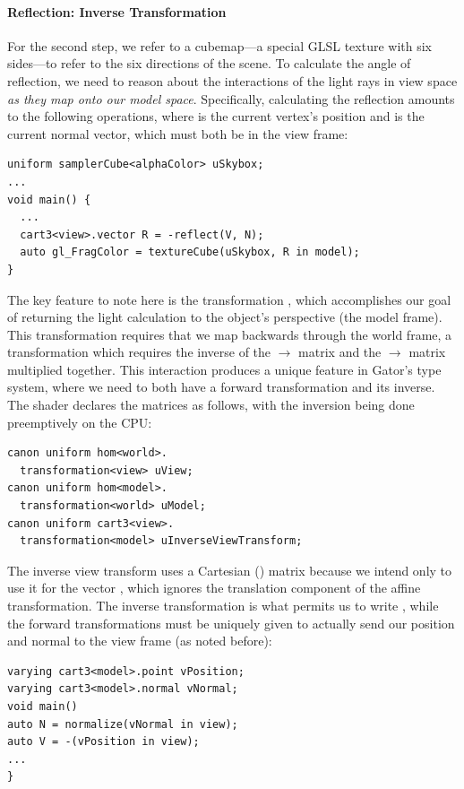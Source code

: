 \documentclass[../main.tex]{subfiles}
\begin{document}
{\paragraph{Reflection: Inverse Transformation}
For the second step, we refer to a cubemap---a special GLSL texture with six sides---to refer to the six directions of the scene.  
To calculate the angle of reflection, we need to reason about the interactions of the light rays in view space \emph{as they map onto our model space}.  
Specifically, calculating the reflection amounts to the following operations, where  is the current vertex's position and  is the current normal vector, which must both be in the view frame:
%
\begin{lstlisting}
uniform samplerCube<alphaColor> uSkybox;
...
void main() {
  ...
  cart3<view>.vector R = -reflect(V, N);
  auto gl_FragColor = textureCube(uSkybox, R in model);
}
\end{lstlisting}
%
The key feature to note here is the transformation , which accomplishes our goal of returning the light calculation to the object's perspective (the model frame).
This transformation requires that we map backwards through the world frame, a transformation which requires the inverse of the $\rightarrow$ matrix and the $\rightarrow$ matrix multiplied together.
This interaction produces a unique feature in Gator's type system, where we need to both have a forward transformation and its inverse.
The shader declares the matrices as follows, with the inversion being done preemptively on the CPU:
%
\begin{lstlisting}
canon uniform hom<world>.
  transformation<view> uView;
canon uniform hom<model>.
  transformation<world> uModel;
canon uniform cart3<view>.
  transformation<model> uInverseViewTransform;
\end{lstlisting}
%
The inverse view transform uses a Cartesian () matrix because
we intend only to use it for the vector , which ignores the translation component of the affine transformation.  The inverse transformation is what permits us to write , while the forward transformations must be uniquely given to actually send our position and normal to the view frame (as noted before):
%
\begin{lstlisting}
varying cart3<model>.point vPosition;
varying cart3<model>.normal vNormal;
void main()
auto N = normalize(vNormal in view);
auto V = -(vPosition in view);
...
}
\end{lstlisting}
%
}
\end{document}
